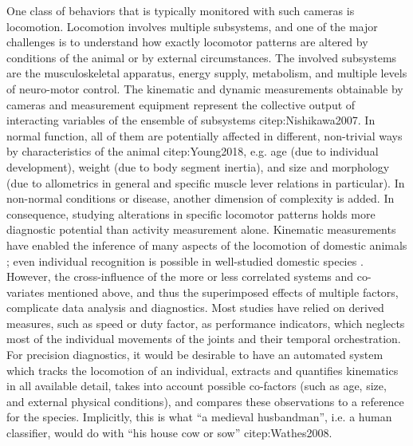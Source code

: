 One class of behaviors that is typically monitored with such cameras is locomotion.
Locomotion involves multiple subsystems, and one of the major challenges is to understand how exactly locomotor patterns are altered by conditions of the animal or by external circumstances.
The involved subsystems are the musculoskeletal apparatus, energy supply, metabolism, and multiple levels of neuro-motor control.
The kinematic and dynamic measurements obtainable by cameras and measurement equipment represent the collective output of interacting variables of the ensemble of subsystems citep:Nishikawa2007.
In normal function, all of them are potentially affected in different, non-trivial ways by characteristics of the animal citep:Young2018, e.g. age (due to individual development), weight (due to body segment inertia), and size and morphology (due to allometrics in general and specific muscle lever relations in particular).
In non-normal conditions or disease, another dimension of complexity is added.
In consequence, studying alterations in specific locomotor patterns holds more diagnostic potential than activity measurement alone.
Kinematic measurements have enabled the inference of many aspects of the locomotion of domestic animals \citep[e.g.][]{SchlageterTello2014,SerraBraganca2018,Qiao2021,Netukova2021}; even individual recognition is possible in well-studied domestic species \citep[e.g.][]{Figueiredo2018,Patua2021}.
However, the cross-influence of the more or less correlated systems and co-variates mentioned above, and thus the superimposed effects of multiple factors, complicate data analysis and diagnostics.
Most studies have relied on derived measures, such as speed or duty factor, as performance indicators, which neglects most of the individual movements of the joints and their temporal orchestration.
For precision diagnostics, it would be desirable to have an automated system which tracks the locomotion of an individual, extracts and quantifies kinematics in all available detail, takes into account possible co-factors (such as age, size, and external physical conditions), and compares these observations to a reference for the species.
Implicitly, this is what ``a medieval husbandman'', i.e. a human classifier, would do with ``his house cow or sow'' citep:Wathes2008.


